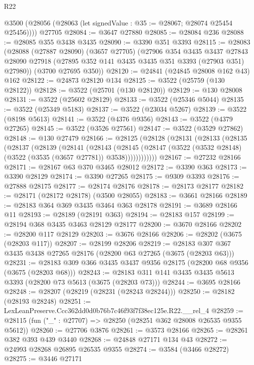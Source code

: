 \begin{lexlean}{R22}
\begin{coremodule}
    @3500 (@28056 (@28063 (let signedValue : @35 := @28067; @28074 @25454 @25456))))
    @27705
@28084 := @3647 @27880
@28085 := @28084 @236
@28088 := @28085 @355 @3438 @3435
@28090 := @3390 @351 @3393
@28115 := @28083
    (@28088
      (@27887 @28090)
      (@3657 @27705)
      (@27906
        @354
        @3435
        @3437
        @27843
        @28090
        @27918
        (@27895 @352 @141 @3435 @3435 @351 @3393 (@27903 @351) @27980))
      (@3700 @27695 @350))
@28120 := @24841 (@24845 @28008 @162 @43) @162
@28122 := @24873 @28120 @134
@28125 := @3522 (@25759 (@130 @28122))
@28128 := @3522 (@25701 (@130 @28120))
@28129 := @130 @28008
@28131 := @3522 (@25602 @28129)
@28133 := @3522 (@25346 @5044)
@28135 := @3522 (@25349 @5183)
@28137 := @3522 (@23034 @5267)
@28139 := @3522 (@8198 @5613)
@28141 := @3522 (@4376 @9356)
@28143 := @3522 (@4379 @27265)
@28145 := @3522 (@3526 @27561)
@28147 := @3522 (@3529 @27862)
@28148 := @130 @27479
@28166 := @28125
    (@28128
      (@28131
        (@28133
          (@28135
            (@28137
              (@28139
                (@28141
                  (@28143
                    (@28145
                      (@28147 (@3522 (@3532 @28148) (@3522 (@3535 (@3657 @27781)) @3538))))))))))))
@28167 := @27232 @28166
@28171 := @28167 @63 @370 @3465 @28012
@28172 := @3390 @363
@28173 := @3390 @28129
@28174 := @3390 @27265
@28175 := @9309 @3393
@28176 := @27888 @28175
@28177 := @28174 @28176
@28178 := @28173 @28177
@28182 := @28171 (@28172 @28178) (@3500 @28055)
@28183 := @3661 @28166
@28189 := @28183 @364 @369 @3435 @3464 @363 @28178
@28191 := @3689 @28166 @11
@28193 := @28189 (@28191 @363)
@28194 := @28183 @157
@28199 := @28194 @368 @3435 @3463 @28129 @28177
@28200 := @3670 @28166
@28202 := @28200 @117 @28129
@28203 := @3676 @28166
@28206 := @28202 (@3675 (@28203 @117))
@28207 := @28199 @28206
@28219 := @28183 @307 @367 @3435 @3438 @27265 @28176 (@28200 @63 @27265 (@3675 (@28203 @63)))
@28231 := @28183 @309 @366 @3435 @3437 @9356 @28175 (@28200 @68 @9356 (@3675 (@28203 @68)))
@28243 := @28183 @311 @141 @3435 @3435 @5613 @3393 (@28200 @73 @5613 (@3675 (@28203 @73)))
@28244 := @3695 @28166
@28248 := @28207 (@28219 (@28231 (@28243 @28244)))
@28250 := @28182 (@28193 @28248)
@28251 := LexLeanPreserve.Ccc362dd0d0b76b7c46f93f7f38ec125e.R22.__rel_4
@28259 := @28115 (fun ("_" : @27707) => @28250 (@28251 @362 @28008 @26535 @9355 @5612))
@28260 := @27706 @3876
@28261 := @3573 @28166
@28265 := @28261 @382 @393 @439 @3440
@28268 := @24848 @27171 @134 @43
@28272 := @24993 @28268 @26895 @26535 @9355
@28274 := @3584 (@3466 @28272)
@28275 := @3446 @27171

\end{coremodule}
\end{lexlean}
